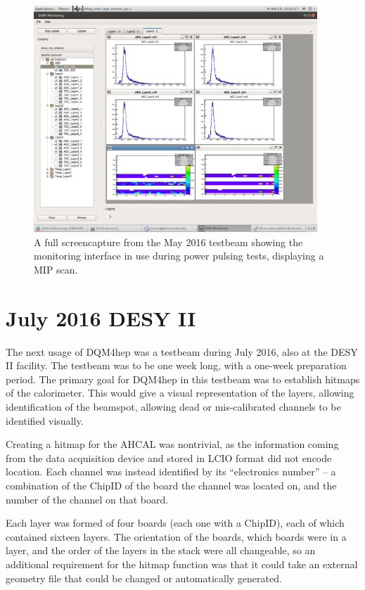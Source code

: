 \begin{figure}[t]
	\centering
	\includegraphics[width=0.95\textwidth]{../Pictures/PowerPulsingMipScans-May2016.png}
	\caption{A full screencapture from the May 2016 testbeam showing the monitoring interface in use during power pulsing tests, displaying a MIP scan.}
	\label{figure:aida/may2016/overview}
\end{figure}

\section{July 2016 DESY II}
The next usage of DQM4hep was a testbeam during July  2016, also at the DESY II facility. The testbeam was to be one week long, with a one-week preparation period. The primary goal for DQM4hep in this testbeam was to establish hitmaps of the calorimeter. This would give a visual representation of the layers, allowing identification of the beamspot, allowing dead or mis-calibrated channels to be identified visually.

Creating a hitmap for the AHCAL was nontrivial, as the information coming from the data acquisition device and stored in LCIO format did not encode location. Each channel was instead identified by its ``electronics number'' -- a combination of the ChipID of the board the channel was located on, and the number of the channel on that board.

Each layer was formed of four boards (each one with a ChipID), each of which contained sixteen layers. The orientation of the boards, which boards were in a layer, and the order of the layers in the stack were all changeable, so an additional requirement for the hitmap function was that it could take an external geometry file that could be changed or automatically generated. 


